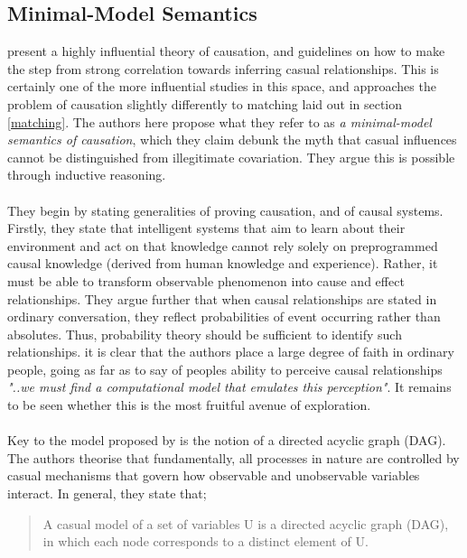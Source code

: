 \subsection{Minimal-Model Semantics}
{\cite{pearl1995theory} present a highly influential theory of causation, and guidelines on how to make the step from strong correlation towards inferring casual relationships. This is certainly one of the more influential studies in this space, and approaches the problem of causation slightly differently to matching laid out in section \ref{matching}. The authors here propose what they refer to as {\it a minimal-model semantics of causation}, which they claim debunk the myth that casual influences cannot be distinguished from illegitimate covariation. They argue this is possible through inductive reasoning.\\\\
They begin by stating generalities of proving causation, and of causal systems. Firstly, they state that intelligent systems that aim to learn about their environment and act on that knowledge cannot rely solely on preprogrammed causal knowledge (derived from human knowledge and experience). Rather, it must be able to transform observable phenomenon into cause and effect relationships. They argue further that when causal relationships are stated in ordinary conversation, they reflect probabilities of event occurring rather than absolutes. Thus, probability theory should be sufficient to identify such relationships. it is clear that the authors place a large degree of faith in ordinary people, going as far as to say of peoples ability to perceive causal relationships {\it "..we must find a computational model that emulates this perception"}. It remains to be seen whether this is the most fruitful avenue of exploration.\\\\
Key to the model proposed by \cite{pearl1995theory} is the notion of a directed acyclic graph (DAG). The authors theorise that fundamentally, all processes in nature are controlled by casual mechanisms that govern how observable and unobservable variables interact. In general, they state that;
\begin{quote}
A casual model of a set of variables U is a directed acyclic graph (DAG), in which each node corresponds to a distinct element of U. 


\end{quote}}
